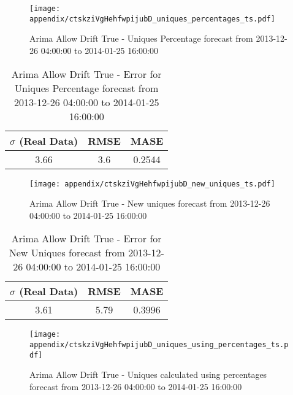 \begin{figure}[H] \begin{center} \leavevmode
\texttt{[image: appendix/ctskziVgHehfwpijubD\_uniques\_percentages\_ts.pdf]} \caption{
Arima Allow Drift True - Uniques Percentage forecast from 2013-12-26 04:00:00 to 2014-01-25 16:00:00} \label{fig:appendix/ctskziVgHehfwpijubD_uniques_percentages_ts.pdf} \end{center}
\end{figure}

\begin{table}[H]
\centering
\footnotesize
\begin{tabular}{ccc}
$\sigma$ (Real Data) & RMSE & MASE   \\ \hline
3.66 & 3.6 & 0.2544 \\
\end{tabular}

\vspace{0.5cm}

\caption{
Arima Allow Drift True - Error for Uniques Percentage forecast from 2013-12-26 04:00:00 to 2014-01-25 16:00:00}
\end{table}

\begin{figure}[H] \begin{center} \leavevmode
\texttt{[image: appendix/ctskziVgHehfwpijubD\_new\_uniques\_ts.pdf]} \caption{
Arima Allow Drift True - New uniques forecast from 2013-12-26 04:00:00 to 2014-01-25 16:00:00} \label{fig:appendix/ctskziVgHehfwpijubD_new_uniques_ts.pdf} \end{center}
\end{figure}

\begin{table}[H]
\centering
\footnotesize
\begin{tabular}{ccc}
$\sigma$ (Real Data) & RMSE & MASE   \\ \hline
3.61 & 5.79 & 0.3996 \\
\end{tabular}

\vspace{0.5cm}

\caption{
Arima Allow Drift True - Error for New Uniques forecast from 2013-12-26 04:00:00 to 2014-01-25 16:00:00}
\end{table}

\begin{figure}[H] \begin{center} \leavevmode
\texttt{[image: appendix/ctskziVgHehfwpijubD\_uniques\_using\_percentages\_ts.pdf]} \caption{
Arima Allow Drift True - Uniques calculated using percentages forecast from 2013-12-26 04:00:00 to 2014-01-25 16:00:00} \label{fig:appendix/ctskziVgHehfwpijubD_uniques_using_percentages_ts.pdf} \end{center}
\end{figure}

